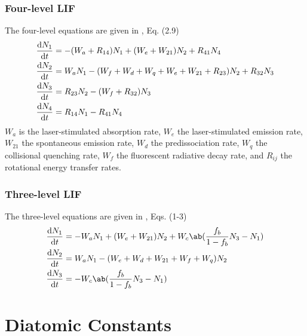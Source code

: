\documentclass[11pt, twoside, fleqn]{report}
\begin{document}
\subsection{Four-level LIF}

The four-level equations are given in \cite{grinsteadTemperatureMeasurementHighTemperature1995}, Eq. (2.9)
\begin{align*}
    \odv{N_1}{t} & = -(W_a + R_{14})N_1 + (W_e + W_{21})N_2 + R_{41}N_4                      \\
    \odv{N_2}{t} & = W_aN_1 - (W_f + W_d + W_q + W_e + W_{21} + R_{23})N_2 + R_{32}N_3 \\
    \odv{N_3}{t} & = R_{23}N_2 - (W_f + R_{32})N_3                                               \\
    \odv{N_4}{t} & = R_{14}N_1 - R_{41}N_4
\end{align*}
$W_a$ is the laser-stimulated absorption rate, $W_e$ the laser-stimulated emission rate, $W_{21}$ the spontaneous emission rate, $W_d$ the predissociation rate, $W_q$ the collisional quenching rate, $W_f$ the fluorescent radiative decay rate, and $R_{ij}$ the rotational energy transfer rates.

\subsection{Three-level LIF}

The three-level equations are given in \cite{diskin3LevelModelSchumann1996}, Eqs. (1-3)
\begin{align*}
    \odv{N_1}{t} & = -W_aN_1 + (W_e + W_{21})N_2 + W_c\ab(\frac{f_b}{1 - f_b}N_3 - N_1) \\
    \odv{N_2}{t} & = W_aN_1 - (W_e + W_d + W_{21} + W_f + W_q)N_2                           \\
    \odv{N_3}{t} & = -W_c\ab(\frac{f_b}{1 - f_b}N_3 - N_1)
\end{align*}

\appendix
\chapter{Diatomic Constants}
\label{a:diatomic_constants}
\end{document}
